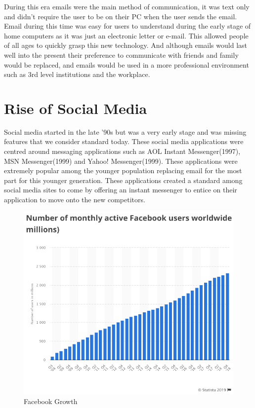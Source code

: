 During this era emails were the main method of communication, it was text only and didn't require the user to be on their PC when the user sends the email. Email during this time was easy for users to understand during the early stage of home computers as it was just an electronic letter or e-mail. This allowed people of all ages to quickly grasp this new technology. And although emails would last well into the present their preference to communicate with friends and family would be replaced, and emails would be used in a more professional environment such as 3rd level institutions and the workplace.

\section{Rise of Social Media}
Social media started in the late '90s but was a very early stage and was missing features that we consider standard today. These social media applications were centred around messaging applications such as AOL Instant Messenger(1997), MSN Messenger(1999) and Yahoo! Messenger(1999). These applications were extremely popular among the younger population replacing email for the most part for this younger generation. These applications created a standard among social media sites to come by offering an instant messenger to entice on their application to move onto the new competitors.

\begin{figure}[!htb]
  \includegraphics[width=\linewidth]{img/facebook-growth.png}
  \caption{Facebook Growth}
  \label{fig:FacebookG}
\end{figure}

